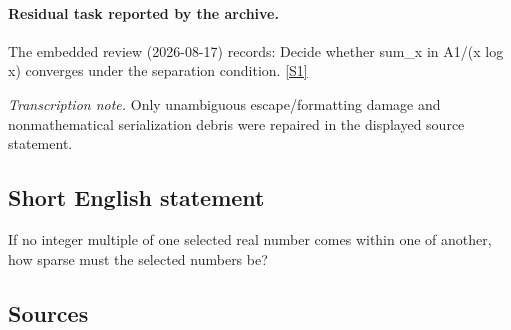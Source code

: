 \documentclass[11pt,a4paper]{article}
\newcommand{\sref}[2]{\hyperlink{source:#1:#2}{[S#2]}}
\begin{document}
\paragraph{Residual task reported by the archive.}

The embedded review (2026-08-17) records: Decide whether sum\_{x in A}1/(x log x) converges under the separation condition. \sref{1954}{1}

{\small\emph{Transcription note.} Only unambiguous escape/formatting damage and nonmathematical serialization debris were repaired in the displayed source statement.}

\subsection{Short English statement}

If no integer multiple of one selected real number comes within one of another, how sparse must the selected numbers be?

\subsection{Sources}
\end{document}
